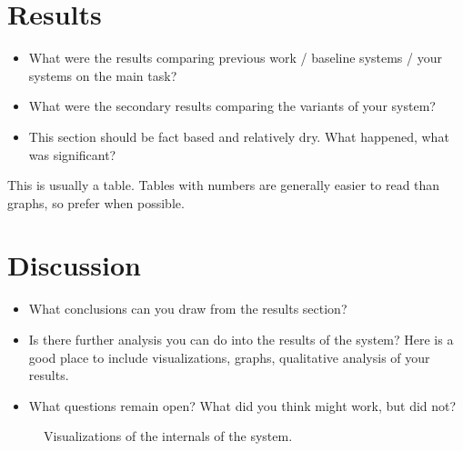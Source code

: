 \documentclass{article}
\begin{document}
\section{Results}

\begin{itemize}
\item What were the results comparing previous work / baseline systems / your systems on the main task?
\item What were the secondary results comparing the variants of your system?
\item This section should be fact based and relatively dry. What happened, what was significant?
\end{itemize}

\begin{table*}
  \centering
  \missingfigure{}
  \caption{This is usually a table. Tables with numbers are generally easier to read than graphs, so prefer when possible.}
  \label{fig:mainres}
\end{table*}





\section{Discussion}



\begin{itemize}
\item What conclusions can you draw from the results section?
\item Is there further analysis you can do into the results of the system? Here is a good place to include visualizations, graphs, qualitative analysis of your results.

\item  What questions remain open? What did you think might work, but did not?
\end{itemize}



\begin{figure}
  \centering
  \missingfigure{}
  \missingfigure{}
  \missingfigure{}
  \caption{Visualizations of the internals of the system.}
\end{figure}
\end{document}
